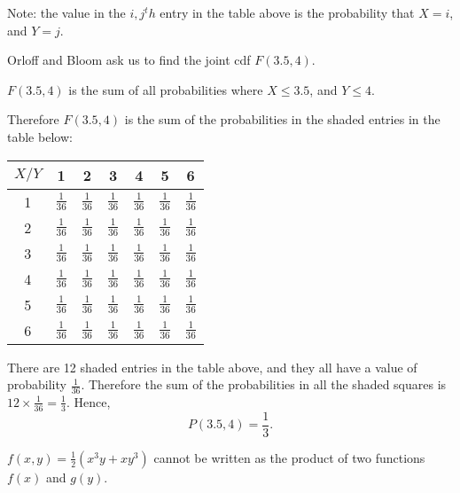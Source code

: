 \documentclass[a4paper,11pt]{article}
\begin{document}
Note: the value in the $i,j^th$ entry in the table above is the probability that
$X=i$, and $Y=j$.

Orloff and Bloom ask us to find the joint cdf $F \left(3.5, 4 \right)$.

$F\left(3.5, 4 \right)$ is the sum of all probabilities where $X \leq 3.5$, and
$Y \leq 4$.

Therefore $F \left( 3.5, 4 \right)$ is the sum of the probabilities in the
shaded entries in the table below:


\begin{center}
  \begin{tabular}{ | c | c | c | c | c | c | c |}
    \hline
    $X/Y$ & 1  & 2  & 3  & 4  & 5  &  6    \\ \hline
    1     & \cellcolor{blue!25} $\frac{1}{36}$  & \cellcolor{blue!25} $\frac{1}{36}$ & \cellcolor{blue!25} $\frac{1}{36}$ & \cellcolor{blue!25} $\frac{1}{36}$ & $\frac{1}{36}$ & $\frac{1}{36}$   \\ \hline
    2     & \cellcolor{blue!25} $\frac{1}{36}$  & \cellcolor{blue!25} $\frac{1}{36}$ & \cellcolor{blue!25} $\frac{1}{36}$ & \cellcolor{blue!25} $\frac{1}{36}$ & $\frac{1}{36}$ & $\frac{1}{36}$   \\ \hline
    3     & \cellcolor{blue!25} $\frac{1}{36}$  & \cellcolor{blue!25} $\frac{1}{36}$ & \cellcolor{blue!25} $\frac{1}{36}$ & \cellcolor{blue!25} $\frac{1}{36}$ & $\frac{1}{36}$ & $\frac{1}{36}$   \\ \hline
    4     &  $\frac{1}{36}$  & $\frac{1}{36}$ & $\frac{1}{36}$ & $\frac{1}{36}$ & $\frac{1}{36}$ & $\frac{1}{36}$   \\ \hline
    5     &  $\frac{1}{36}$  & $\frac{1}{36}$ & $\frac{1}{36}$ & $\frac{1}{36}$ & $\frac{1}{36}$ & $\frac{1}{36}$   \\ \hline
    6     &  $\frac{1}{36}$  & $\frac{1}{36}$ & $\frac{1}{36}$ & $\frac{1}{36}$ & $\frac{1}{36}$ & $\frac{1}{36}$   \\ \hline
  \end{tabular}
\end{center}

There are 12 shaded entries in the table above, and they all have a value of
probability $\frac{1}{36}$.  Therefore the sum of the probabilities in all
the shaded squares is $ 12 \times \frac{1}{36} = \frac{1}{3}$.  Hence,
\begin{equation}
  P \left( 3.5, 4 \right) = \frac{1}{3}.
\end{equation}

$f\left(x, y \right)=\frac{1}{2}\left(x^3y + xy^3 \right)$ cannot be 
written as the product of two functions $f\left(x \right)$ and
$g\left(y \right)$.
\end{document}
